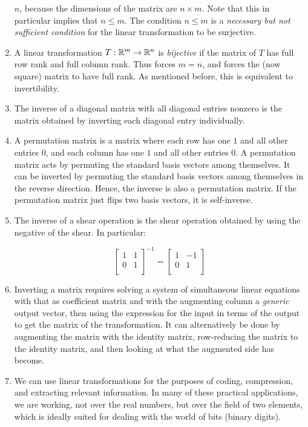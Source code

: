 \documentclass[10pt]{amsart}
\begin{document}
\begin{enumerate}
  $n$, because the dimensions of the matrix are $n \times m$. Note
  that this in particular implies that $n \le m$. The condition $n \le
  m$ is a {\em necessary but not sufficient condition} for the linear
  transformation to be surjective.
\item A linear transformation $T:\mathbb{R}^m \to \mathbb{R}^n$ is {\em bijective} if
  the matrix of $T$ has full row rank and full column rank. Thus
  forces $m = n$, and forces the (now square) matrix to have full
  rank. As mentioned before, this is equivalent to invertibility.
\item The inverse of a diagonal matrix with all diagonal entries
  nonzero is the matrix obtained by inverting each diagonal entry
  individually.
\item A permutation matrix is a matrix where each row has one $1$ and
  all other entries $0$, and each column has one $1$ and all other
  entries $0$. A permutation matrix acts by permuting the standard
  basis vectors among themselves. It can be inverted by permuting the
  standard basis vectors among themselves in the reverse
  direction. Hence, the inverse is also a permutation matrix. If the
  permutation matrix just flips two basis vectors, it is self-inverse.
\item The inverse of a shear operation is the shear operation obtained
  by using the negative of the shear. In particular:

  $$\left[\begin{matrix} 1 & 1 \\ 0 & 1 \\\end{matrix} \right]^{-1} = \left[\begin{matrix} 1 & -1 \\ 0 & 1 \\\end{matrix}\right]$$
\item Inverting a matrix requires solving a system of simultaneous
  linear equations with that as coefficient matrix and with the
  augmenting column a {\em generic} output vector, then using the
  expression for the input in terms of the output to get the matrix of
  the transformation. It can alternatively be done by augmenting the
  matrix with the identity matrix, row-reducing the matrix to the
  identity matrix, and then looking at what the augmented side has
  become.
\item We can use linear transformations for the purposes of coding,
  compression, and extracting relevant information. In many of these
  practical applications, we are working, not over the real numbers,
  but over the field of two elements, which is ideally suited for
  dealing with the world of bits (binary digits).
\end{enumerate}
\end{document}
